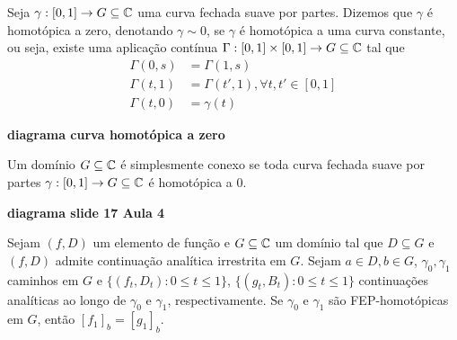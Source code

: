     \begin{definicao}
    \label{def-homotopica-a-zero}
        Seja $\gamma:[0,1]\to G\subseteq\mathbb{C}$ uma curva fechada suave por partes.
        Dizemos que $\gamma$ é homotópica a zero, denotando $\gamma\sim 0$, se $\gamma$
        é homotópica a uma curva constante, ou seja, existe uma aplicação contínua 
        $\Gamma:[0,1]\times [0,1] \to G\subseteq\mathbb{C}$ tal que
        \begin{align*}
            \Gamma(0,s) &= \Gamma(1,s) \\
            \Gamma(t,1) &= \Gamma(t',1), \forall t, t'\in [0,1] \\
            \Gamma(t,0) &= \gamma(t)
        \end{align*}
        \begin{center}
            \textbf{diagrama curva homotópica a zero}
        \end{center}
    \end{definicao}

    \begin{definicao}
    \label{def-simplesmente-conexo}
        Um domínio $G\subseteq\mathbb{C}$ é simplesmente conexo se toda curva fechada
        suave por partes $\gamma: [0,1]\to G\subseteq\mathbb{C}$ é homotópica a 0.
        \begin{center}
            \textbf{diagrama slide 17 Aula 4}
        \end{center}
    \end{definicao}

    \begin{teorema}
    \label{teo-monodromia}
        Sejam $(f,D)$ um elemento de função e $G\subseteq\mathbb{C}$ um domínio tal que 
        $D\subseteq G$ e $(f,D)$ admite continuação analítica irrestrita em $G$. Sejam
        $a\in D, b\in G$, $\gamma_0, \gamma_1$ caminhos em $G$ e 
        $\{ (f_t, D_t) : 0\leq t\leq 1 \}$, $\{ (g_t, B_t) : 0\leq t\leq 1 \}$ continuações
        analíticas ao longo de $\gamma_0$ e $\gamma_1$, respectivamente. 
        Se $\gamma_0$ e $\gamma_1$ são FEP-homotópicas em $G$, então $[f_1]_b = [g_1]_b$.
    \end{teorema}

